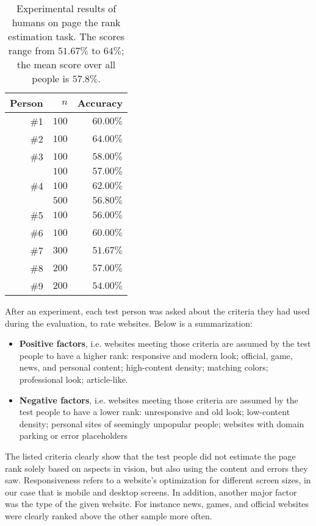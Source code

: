 \begin{table}[]
	\center
	\begin{tabular}{r|r|r}
		\textbf{Person} & $n$ & \textbf{Accuracy} \\ \hline \hline
		\#1 & $100$ & $60.00\%$ \\ \hline
		\#2 & $100$ & $64.00\%$\\ \hline
		\#3 & $100$ & $58.00\%$\\ \hline
            & $100$ & $57.00\%$\\
        \#4 & $100$ & $62.00\%$\\
            & $500$ & $56.80\%$\\ \hline
		\#5 & $100$ & $56.00\%$\\ \hline
		\#6 & $100$ & $60.00\%$\\ \hline
		\#7 & $300$ & $51.67\%$\\ \hline
		\#8 & $200$ & $57.00\%$\\ \hline
		\#9 & $200$ & $54.00\%$\\
	\end{tabular}
	\caption[Experimental results of humans on the page rank estimation task]{Experimental results of humans on page the rank estimation task. The scores range from $51.67\%$ to $64\%$; the mean score over all people is $57.8\%$.}
\label{table_human_eval_results}
\end{table}

After an experiment, each test person was asked about the criteria they had used during the evaluation, to rate websites. Below is a summarization:

\begin{itemize}
	\item \textbf{Positive factors}, i.e. websites meeting those criteria are assumed by the test people to have a higher rank: responsive and modern look; official, game, news, and personal content; high-content density; matching colors; professional look; article-like.
	\item \textbf{Negative factors}, i.e. websites meeting those criteria are assumed by the test people to have a lower rank: unresponsive and old look; low-content density; personal sites of seemingly unpopular people; websites with domain parking or error placeholders
\end{itemize}

The listed criteria clearly show that the test people did not estimate the page rank solely based on aspects in vision, but also using the content and errors they saw. Responsiveness refers to a website's optimization for different screen sizes, in our case that is mobile and desktop screens. In addition, another major factor was the type of the given website. For instance news, games, and official websites were clearly ranked above the other sample more often.

